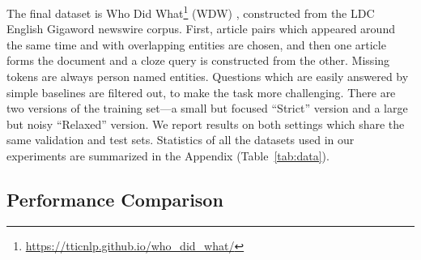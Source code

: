 \documentclass[11pt,a4paper]{article}
\begin{document}
The final dataset is Who Did What\footnote{\scriptsize \url{ https://tticnlp.github.io/who_did_what/}} (WDW) \citep{onishi2016did},
constructed from the LDC English Gigaword newswire corpus.
First, article pairs which appeared around the same time and with overlapping entities are chosen, and then one article forms the document and a cloze query is constructed from the other. Missing tokens are always person named entities.
Questions which are easily answered by simple baselines are filtered out,
to make the task more challenging. There are two versions of the training set---a small but focused ``Strict'' version and a large but noisy ``Relaxed'' version.
We report results on both settings which share the same validation and test sets. Statistics of all the datasets used in our experiments are summarized in the Appendix (Table~\ref{tab:data}).

\subsection{Performance Comparison}
\end{document}

